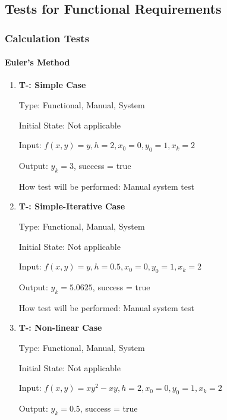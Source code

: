 \documentclass[12pt, titlepage]{article}
\newcounter{tnum} %
\begin{document}
\subsection{Tests for Functional Requirements}

\subsubsection{Calculation Tests}
		
\paragraph{Euler's Method}

\begin{enumerate}

\item{\textbf{T-\thetnum \label{t-euler_simple}: Simple Case}}

Type: Functional, Manual, System %
					
Initial State: Not applicable
					
Input: $f(x, y) = y, h = 2, x_0 = 0, y_0 = 1, x_k = 2$
					
Output: $y_k = 3$, success = true
					
How test will be performed: Manual system test

\item{\textbf{T-\thetnum \label{t-euler_simpleiterative}: Simple-Iterative Case}}

Type: Functional, Manual, System %
					
Initial State: Not applicable
					
Input: $f(x, y) = y, h = 0.5, x_0 = 0, y_0 = 1, x_k = 2$
					
Output: $y_k = 5.0625$, success = true
					
How test will be performed: Manual system test

\item{\textbf{T-\thetnum \label{t-euler_nonlinear}: Non-linear Case}}

Type: Functional, Manual, System %
					
Initial State: Not applicable
					
Input: $f(x, y) = xy^2 - xy, h = 2, x_0 = 0, y_0 = 1, x_k = 2$
					
Output: $y_k = 0.5$, success = true
					

\end{enumerate}
\end{document}

